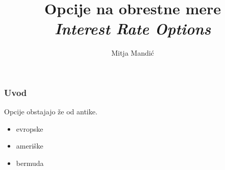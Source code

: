 \documentclass[14pt]{beamer}
\begin{document}
\title{Opcije na obrestne mere \\ \textit{Interest Rate Options}}
\author{Mitja Mandić}

\begin{frame}
    \titlepage
\end{frame}

\begin{frame}
    \frametitle{Uvod}
Opcije obstajajo že od antike.
\pause
\begin{itemize}
    \item evropske
    \pause
    \item ameriške
\pause
    \item bermuda
\end{itemize}

\end{frame}
\end{document}
